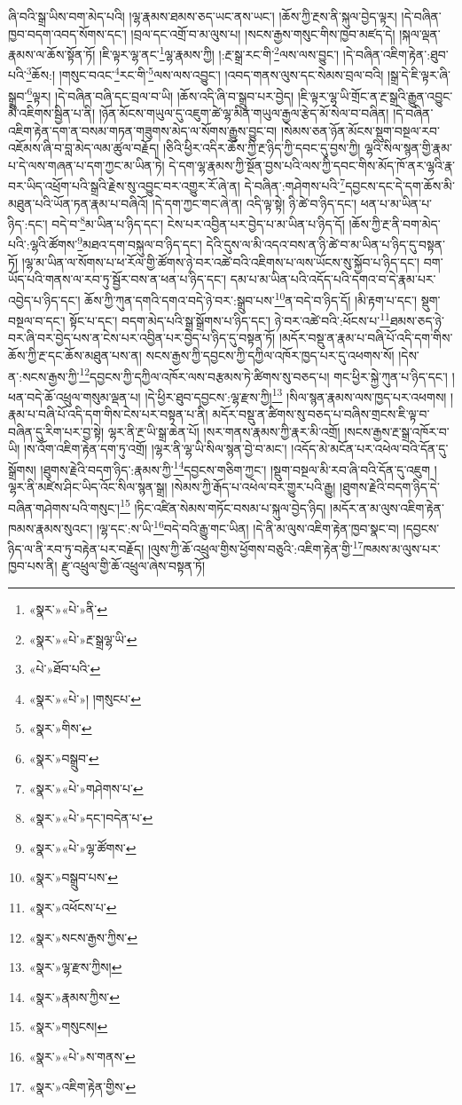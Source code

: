 ཞི་བའི་སྒྲ་ཡིས་བག་མེད་པའི། །ལྷ་རྣམས་ཐམས་ཅད་ཡང་ནས་ཡང་། །ཆོས་ཀྱི་རྔས་ནི་སྐུལ་བྱེད་ལྟར། །དེ་བཞིན་ཁྱབ་བདག་འབད་སོགས་དང་། །བྲལ་དང་འགྲོ་བ་མ་ལུས་པ། །སངས་རྒྱས་གསུང་གིས་ཁྱབ་མཛད་དེ། །སྐལ་ལྡན་རྣམས་ལ་ཆོས་སྟོན་ཏོ། །ཇི་ལྟར་ལྷ་ནང་\footnote{«སྣར་»«པེ་»ནི་}ལྷ་རྣམས་ཀྱི། །:རྔ་སྒྲ་རང་གི་\footnote{«སྣར་»«པེ་»རྔ་སྒྲལྷ་ཡི་}ལས་ལས་བྱུང་། །དེ་བཞིན་འཇིག་རྟེན་:ཐུབ་པའི་\footnote{«པེ་»ཐོབ་པའི་}ཆོས:། །གསུང་བའང་\footnote{«སྣར་»«པེ་»། །གསུངཔ་}རང་གི་\footnote{«སྣར་»གིས་}ལས་ལས་འབྱུང་། །འབད་གནས་ལུས་དང་སེམས་བྲལ་བའི། །སྒྲ་དེ་ཇི་ལྟར་ཞི་སྒྲུབ་\footnote{«སྣར་»བསྒྲུབ་}ལྟར། །དེ་བཞིན་བཞི་དང་བྲལ་བ་ཡི། །ཆོས་འདི་ཞི་བ་སྒྲུབ་པར་བྱེད། །ཇི་ལྟར་ལྷ་ཡི་གྲོང་ན་རྔ་སྒྲའི་རྒྱུན་འབྱུང་མི་འཇིགས་སྦྱིན་པ་ནི། །ཉོན་མོངས་གཡུལ་དུ་འཇུག་ཚེ་ལྷ་མིན་གཡུལ་རྒྱལ་རྩེད་མོ་སེལ་བ་བཞིན། །དེ་བཞིན་འཇིག་རྟེན་དག་ན་བསམ་གཏན་གཟུགས་མེད་ལ་སོགས་རྒྱུས་བྱུང་བ། །སེམས་ཅན་ཉོན་མོངས་སྡུག་བསྔལ་རབ་འཇོམས་ཞི་བ་བླ་མེད་ལམ་ཚུལ་བརྗོད། །ཅིའི་ཕྱིར་འདིར་ཆོས་ཀྱི་རྔ་ཉིད་ཀྱི་དབང་དུ་བྱས་ཀྱི། ལྷའི་སིལ་སྙན་གྱི་རྣམ་པ་དེ་ལས་གཞན་པ་དག་ཀྱང་མ་ཡིན་ཏེ། དེ་དག་ལྷ་རྣམས་ཀྱི་སྔོན་བྱས་པའི་ལས་ཀྱི་དབང་གིས་མོད་ཁོ་ནར་ལྷའི་རྣ་བར་ཡིད་འཕྲོག་པའི་སྒྲའི་རྗེས་སུ་འབྱུང་བར་འགྱུར་རོ་ཞེ་ན། དེ་བཞིན་:གཤེགས་པའི་\footnote{«སྣར་»«པེ་»གཤེགས་པ་}དབྱངས་དང་དེ་དག་ཆོས་མི་མཐུན་པའི་ཡོན་ཏན་རྣམ་པ་བཞིའོ། །དེ་དག་ཀྱང་གང་ཞེ་ན། འདི་ལྟ་སྟེ། ཉི་ཚེ་བ་ཉིད་དང་། ཕན་པ་མ་ཡིན་པ་ཉིད་:དང་། བདེ་བ་\footnote{«སྣར་»«པེ་»དང་།བདེན་པ་}མ་ཡིན་པ་ཉིད་དང་། ངེས་པར་འབྱིན་པར་བྱེད་པ་མ་ཡིན་པ་ཉིད་དོ། །ཆོས་ཀྱི་རྔ་ནི་བག་མེད་པའི་:ལྷའི་ཚོགས་\footnote{«སྣར་»«པེ་»ལྷ་ཚོགས་}མཐའ་དག་བསྐུལ་བ་ཉིད་དང་། དེའི་དུས་ལ་མི་འདའ་བས་ན་ཉི་ཚེ་བ་མ་ཡིན་པ་ཉིད་དུ་བསྟན་ཏོ། །ལྷ་མ་ཡིན་ལ་སོགས་པ་ཕ་རོལ་གྱི་ཚོགས་ཉེ་བར་འཚེ་བའི་འཇིགས་པ་ལས་ཡོངས་སུ་སྐྱོབ་པ་ཉིད་དང་། བག་ཡོད་པའི་གནས་ལ་རབ་ཏུ་སྦྱོར་བས་ན་ཕན་པ་ཉིད་དང་། དམ་པ་མ་ཡིན་པའི་འདོད་པའི་དགའ་བ་དེ་རྣམ་པར་འབྱེད་པ་ཉིད་དང་། ཆོས་ཀྱི་ཀུན་དགའི་དགའ་བདེ་ཉེ་བར་:སྒྲུབ་པས་\footnote{«སྣར་»བསྒྲུབ་པས་}ན་བདེ་བ་ཉིད་དོ། །མི་རྟག་པ་དང་། སྡུག་བསྔལ་བ་དང་། སྟོང་པ་དང་། བདག་མེད་པའི་སྒྲ་སྒྲོགས་པ་ཉིད་དང་། ཉེ་བར་འཚེ་བའི་:ཕོངས་པ་\footnote{«སྣར་»འཕོངས་པ་}ཐམས་ཅད་ཉེ་བར་ཞི་བར་བྱེད་པས་ན་ངེས་པར་འབྱིན་པར་བྱེད་པ་ཉིད་དུ་བསྟན་ཏོ། །མདོར་བསྡུ་ན་རྣམ་པ་བཞི་པོ་འདི་དག་གིས་ཆོས་ཀྱི་རྔ་དང་ཆོས་མཐུན་པས་ན། སངས་རྒྱས་ཀྱི་དབྱངས་ཀྱི་དཀྱིལ་འཁོར་ཁྱད་པར་དུ་འཕགས་སོ། །དེས་ན་:སངས་རྒྱས་ཀྱི་\footnote{«སྣར་»སངས་རྒྱས་ཀྱིས་}དབྱངས་ཀྱི་དཀྱིལ་འཁོར་ལས་བརྩམས་ཏེ་ཚིགས་སུ་བཅད་པ། གང་ཕྱིར་སྐྱེ་ཀུན་པ་ཉིད་དང་། །ཕན་བདེ་ཆོ་འཕྲུལ་གསུམ་ལྡན་པ། །དེ་ཕྱིར་ཐུབ་དབྱངས་:ལྷ་རྫས་ཀྱི།\footnote{«སྣར་»ལྷ་རྫས་ཀྱིས།} །སིལ་སྙན་རྣམས་ལས་ཁྱད་པར་འཕགས། །རྣམ་པ་བཞི་པོ་འདི་དག་གིས་ངེས་པར་བསྟན་པ་ནི། མདོར་བསྡུ་ན་ཚིགས་སུ་བཅད་པ་བཞིས་གྲངས་ཇི་ལྟ་བ་བཞིན་དུ་རིག་པར་བྱ་སྟེ། ལྷར་ནི་རྔ་ཡི་སྒྲ་ཆེན་པོ། །སར་གནས་རྣམས་ཀྱི་རྣར་མི་འགྲོ། །སངས་རྒྱས་རྔ་སྒྲ་འཁོར་བ་ཡི། །ས་འོག་འཇིག་རྟེན་དག་ཏུ་འགྲོ། །ལྷར་ནི་ལྷ་ཡི་སིལ་སྙན་བྱེ་བ་མང་། །འདོད་མེ་མངོན་པར་འཕེལ་བའི་དོན་དུ་སྒྲོགས། །ཐུགས་རྗེའི་བདག་ཉིད་:རྣམས་ཀྱི་\footnote{«སྣར་»རྣམས་ཀྱིས་}དབྱངས་གཅིག་ཀྱང་། །སྡུག་བསྔལ་མི་རབ་ཞི་བའི་དོན་དུ་འཇུག །ལྷར་ནི་མཛེས་ཤིང་ཡིད་འོང་སིལ་སྙན་སྒྲ། །སེམས་ཀྱི་རྒོད་པ་འཕེལ་བར་གྱུར་པའི་རྒྱུ། །ཐུགས་རྗེའི་བདག་ཉིད་དེ་བཞིན་གཤེགས་པའི་གསུང་།\footnote{«སྣར་»གསུངས།} །ཏིང་འཛིན་སེམས་གཏོང་བསམ་པ་སྐུལ་བྱེད་ཉིད། །མདོར་ན་མ་ལུས་འཇིག་རྟེན་ཁམས་རྣམས་སུའང་། །ལྷ་དང་:ས་ཡི་\footnote{«སྣར་»«པེ་»ས་གནས་}བདེ་བའི་རྒྱུ་གང་ཡིན། །དེ་ནི་མ་ལུས་འཇིག་རྟེན་ཁྱབ་སྣང་བ། །དབྱངས་ཉིད་ལ་ནི་རབ་ཏུ་བརྟེན་པར་བརྗོད། །ལུས་ཀྱི་ཆོ་འཕྲུལ་གྱིས་ཕྱོགས་བཅུའི་:འཇིག་རྟེན་གྱི་\footnote{«སྣར་»འཇིག་རྟེན་གྱིས་}ཁམས་མ་ལུས་པར་ཁྱབ་པས་ནི། རྫུ་འཕྲུལ་གྱི་ཆོ་འཕྲུལ་ཞེས་བསྟན་ཏོ། 
